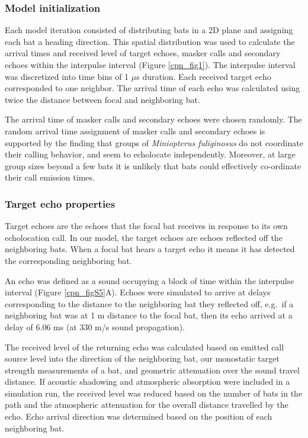 \documentclass[
]{book}
\begin{document}
\hypertarget{model-initialization}{%
\subsubsection{Model initialization}\label{model-initialization}}

Each model iteration consisted of distributing bats in a 2D plane and assigning
each bat a heading direction. This spatial distribution was used to calculate the arrival times and received level of target echoes, masker calls and secondary echoes within the interpulse interval (Figure \ref{cpn_fig1}). The interpulse interval was discretized into time bins of 1 \(\mu\)s duration. Each received target echo corresponded to one neighbor. The arrival time of each echo was calculated using twice the distance between focal and neighboring bat.

The arrival time of masker calls and secondary echoes were chosen randomly.
The random arrival time assignment of masker calls and secondary echoes is
supported by the finding that groups of \emph{Miniopterus fuliginosus} \citep{hase2018a} do not coordinate their calling behavior, and seem to echolocate independently.
Moreover, at large group sizes beyond a few bats it is unlikely that bats could effectively co-ordinate their call emission times.

\hypertarget{target-echo-properties}{%
\subsubsection{Target echo properties}\label{target-echo-properties}}

Target echoes are the echoes that the focal bat receives in response to its own
echolocation call. In our model, the target echoes are echoes reflected off the
neighboring bats. When a focal bat hears a target echo it means it has detected
the corresponding neighboring bat.

An echo was defined as a sound occupying a block of time within the interpulse
interval (Figure \ref{cpn_figS5}A). Echoes were simulated to arrive at delays corresponding to
the distance to the neighboring bat they reflected off, e.g.~if a neighboring bat was at 1 m distance to the focal bat, then its echo arrived at a delay of 6.06 ms (at 330 m/s sound propagation).

The received level of the returning echo was calculated based on emitted call
source level into the direction of the neighboring bat, our monostatic target strength
measurements of a bat, and geometric attenuation over the sound travel distance.
If acoustic shadowing and atmospheric absorption were included in a simulation
run, the received level was reduced based on the number of bats in the path and
the atmospheric attenuation for the overall distance travelled by the echo. Echo
arrival direction was determined based on the position of each neighboring bat.
\end{document}
